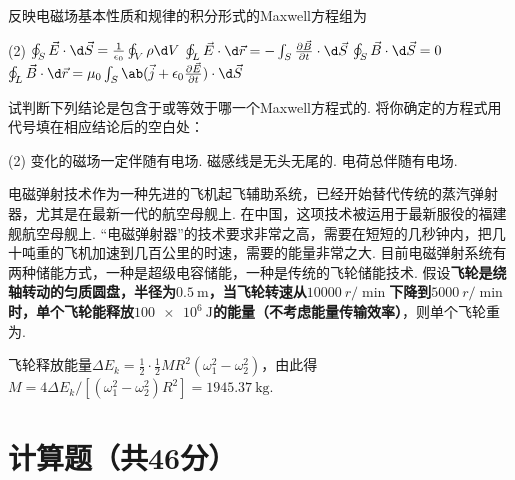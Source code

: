 \documentclass[quiet, fontset = fandol, AutoFakeSlant, 10pt]{ctexart}
\let \emph \textbf
\begin{document}
\begin{problem}[本题3分]
    反映电磁场基本性质和规律的积分形式的Maxwell方程组为
    \begin{tasks}[label = (\arabic*)](2)
        \task $\oint_S\vec E\cdot\d\vec S=\frac1{\epsilon_0}\oint_V\rho\d V$
        \task $\oint_L\vec E\cdot\d\vec r=-\int_S\pdv{\vec B}t\cdot\d\vec S$
        \task $\oint_S\vec B\cdot\d\vec S=0$
        \task $\oint_L\vec B\cdot\d\vec r=\mu_0\int_S\ab(\vec j+\epsilon_0\pdv{\vec E}t)\cdot\d\vec S$
    \end{tasks}
    试判断下列结论是包含于或等效于哪一个Maxwell方程式的. 将你确定的方程式用代号填在相应结论后的空白处：
    \begin{tasks}[label = \arabic*.](2)
        \task 变化的磁场一定伴随有电场.
        \task 磁感线是无头无尾的.
        \task 电荷总伴随有电场.
    \end{tasks}
\end{problem}

\begin{problem}[本题3分]
    电磁弹射技术作为一种先进的飞机起飞辅助系统，已经开始替代传统的蒸汽弹射器，尤其是在最新一代的航空母舰上. 在中国，这项技术被运用于最新服役的福建舰航空母舰上. ``电磁弹射器''的技术要求非常之高，需要在短短的几秒钟内，把几十吨重的飞机加速到几百公里的时速，需要的能量非常之大. 目前电磁弹射系统有两种储能方式，一种是超级电容储能，一种是传统的飞轮储能技术. 假设\emph{飞轮是绕轴转动的匀质圆盘，半径为$\qty{0.5}\m$，当飞轮转速从$\qty{10000}{r/\min}$下降到$\qty{5000}{r/\min}$时，单个飞轮能释放$\qty{100e6}\J$的能量（不考虑能量传输效率）}，则单个飞轮重为.
\end{problem}
\begin{solution}
    飞轮释放能量$\Delta E_k=\frac12\cdot\frac12MR^2(\omega_1^2-\omega_2^2)$，由此得$M=4\Delta E_k/[(\omega_1^2-\omega_2^2)R^2]=\qty{1945.37}\kg$.
\end{solution}

\section{计算题（共46分）}
\end{document}
